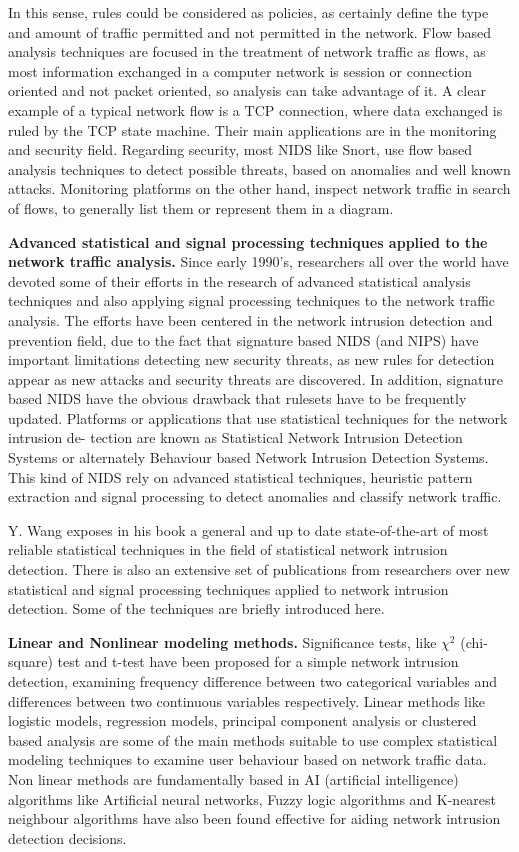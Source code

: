 \documentclass[thesis=M,english]{FITthesis}[2011/07/15]
\begin{document}
In this sense, rules could be considered as policies, as certainly define the type and amount of traffic permitted and not permitted in the network. Flow based analysis techniques are focused in the treatment of network traffic as flows, as most information exchanged in a computer network is session or connection oriented and not packet oriented, so analysis can take advantage of it. A clear example of a typical network flow is a TCP connection, where data exchanged is ruled by the TCP state machine.
Their main applications are in the monitoring and security field. Regarding security, most NIDS like Snort, use flow based analysis techniques to detect possible threats, based on anomalies and well known attacks. Monitoring platforms on the other hand, inspect network traffic in search of flows, to generally list them or represent them in a diagram.

\textbf{Advanced statistical and signal processing techniques applied to the network traffic analysis.}
Since early 1990’s, researchers all over the world have devoted some of their efforts in the research of advanced statistical analysis techniques and also applying signal processing techniques to the network traffic analysis. The efforts have been centered in the network intrusion detection and prevention field, due to the fact that signature based NIDS (and NIPS) have important limitations detecting new security threats, as new rules for detection appear as new attacks and security threats are discovered. In addition,
signature based NIDS have the obvious drawback that rulesets have to be frequently updated. Platforms or applications that use statistical techniques for the network intrusion de-
tection are known as Statistical Network Intrusion Detection Systems or alternately Behaviour based Network Intrusion Detection Systems. This kind of NIDS rely on advanced statistical techniques, heuristic pattern extraction and signal processing to detect anomalies and classify network traffic.

Y. Wang exposes in his book a general and up to date state-of-the-art of most reliable statistical techniques in the field of statistical network intrusion detection. There
is also an extensive set of publications from researchers over new statistical and signal processing techniques applied to network intrusion detection. Some of the techniques
are briefly introduced here.

\textbf{Linear and Nonlinear modeling methods.}
Significance tests, like $\chi^2$ (chi-square) test and t-test have been proposed for a simple network intrusion detection, examining frequency difference between two categorical variables and differences between two continuous variables respectively. Linear methods like logistic models, regression models, principal component analysis or clustered based analysis are some of the main methods suitable to use complex statistical modeling techniques to examine user behaviour based on network traffic data. 
Non linear methods are fundamentally based in AI (artificial intelligence) algorithms like Artificial neural networks, Fuzzy logic algorithms and K-nearest neighbour algorithms have also been found effective for aiding network intrusion detection decisions.
\end{document}
